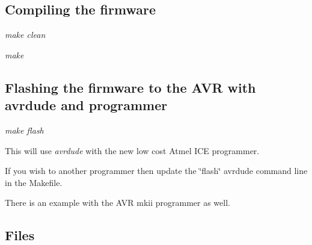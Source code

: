 {\bfseries \subsection*{Compiling the firmware}}

{\bfseries 
\begin{DoxyItemize}
\item {\itshape make clean}
\item {\itshape make}
\end{DoxyItemize}}

{\bfseries \subsection*{Flashing the firmware to the A\+VR with avrdude and programmer}}

{\bfseries 
\begin{DoxyItemize}
\item {\itshape make flash}
\begin{DoxyItemize}
\item This will use {\itshape avrdude} with the new low cost Atmel I\+CE programmer.
\begin{DoxyItemize}
\item If you wish to another programmer then update the \char`\"{}flash\char`\"{} avrdude command line in the Makefile.
\item There is an example with the A\+VR mkii programmer as well.
\end{DoxyItemize}
\end{DoxyItemize}
\end{DoxyItemize}}

{\bfseries \subsection*{Files}}

